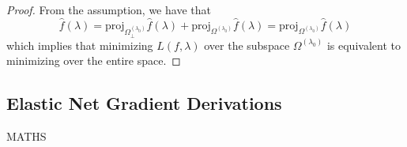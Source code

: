 \documentclass[10pt,letterpaper]{article}
\newtheorem{lemma}{Lemma}
\begin{document}
\begin{proof}
From the assumption, we have that
\begin{equation}
\hat f(\lambda) = \text{proj}_{\Omega_{\bot}^{(\lambda_0)}} \hat f(\lambda) + \text{proj}_{\Omega^{(\lambda_0)}} \hat f(\lambda) = \text{proj}_{\Omega^{(\lambda_0)}} \hat f(\lambda)
\end{equation}
which implies that minimizing $L(f, \lambda)$ over the subspace $\Omega^{(\lambda_0)}$ is equivalent to minimizing over the entire space.
\end{proof}


%
%
%
%
%
%


\subsection{Elastic Net Gradient Derivations}
MATHS
\end{document}
